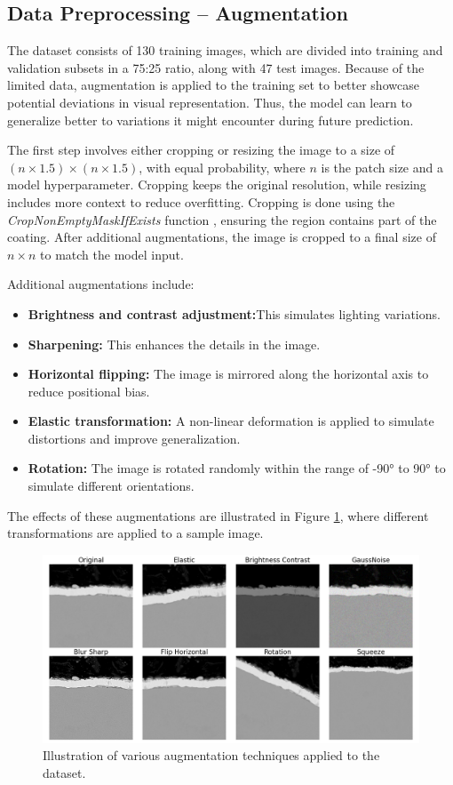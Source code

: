 \subsection{Data Preprocessing – Augmentation} \label{sec:aug}
The dataset consists of 130 training images, which are divided into training and validation subsets in a 75:25 ratio, along with 47 test images. Because of the limited data, augmentation is applied to the training set to better showcase potential deviations in visual representation. Thus, the model can learn to generalize better to variations it might encounter during future prediction. 

The first step involves either cropping or resizing the image to a size of $(n \times 1.5) \times (n \times 1.5)$, with equal probability, where $n$ is the patch size and a model hyperparameter. Cropping keeps the original resolution, while resizing includes more context to reduce overfitting. Cropping is done using the \textit{CropNonEmptyMaskIfExists} function \cite{info11020125}, ensuring the region contains part of the coating. After additional augmentations, the image is cropped to a final size of $n \times n$ to match the model input.

Additional augmentations include:

\begin{itemize}
    \item \textbf{Brightness and contrast adjustment:}This simulates lighting variations.
    \item \textbf{Sharpening:} This enhances the details in the image.
    \item \textbf{Horizontal flipping:} The image is mirrored along the horizontal axis to reduce positional bias.
    \item \textbf{Elastic transformation:} A non-linear deformation is applied to simulate distortions and improve generalization.
    \item \textbf{Rotation:} The image is rotated randomly within the range of -90° to 90° to simulate different orientations.
\end{itemize}

The effects of these augmentations are illustrated in Figure \ref{fig:augmentation}, where different transformations are applied to a sample image.

\begin{figure}[H]
\centering
\includegraphics[width=1\linewidth]{PICTURES/augumentation.png}
\caption{Illustration of various augmentation techniques applied to the dataset.}
\label{fig:augmentation}
\end{figure}

